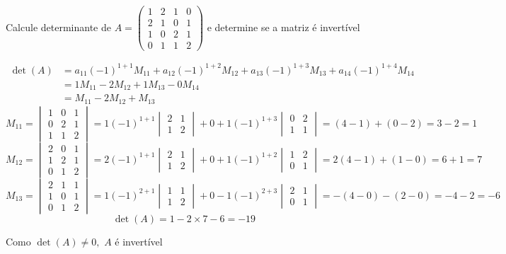 \documentclass[a4paper,12pt,fleqn]{article}
\begin{document}

Calcule determinante de
\(
  A =
  \begin{pmatrix}
    1 & 2 & 1 & 0 \\
    2 & 1 & 0 & 1 \\
    1 & 0 & 2 & 1 \\
    0 & 1 & 1 & 2
  \end{pmatrix}
\)
e determine se a matriz é invertível

\begin{answer}
\begin{align*}
  \det(A)
  & = a_{11}(-1)^{1+1} M_{11}
    + a_{12}(-1)^{1+2} M_{12}
    + a_{13}(-1)^{1+3} M_{13}
    + a_{14}(-1)^{1+4} M_{14} \\
  & = 1 M_{11} - 2 M_{12} + 1 M_{13} - 0 M_{14}   \\
  & = M_{11} - 2 M_{12} + M_{13}
\end{align*}
\[
  M_{11}
  = \begin{vmatrix}
      1 & 0 & 1 \\
      0 & 2 & 1 \\
      1 & 1 & 2
    \end{vmatrix}
  = 1 (-1)^{1+1}
    \begin{vmatrix}
      2 & 1 \\
      1 & 2
    \end{vmatrix}
    + 0
    + 1 (-1)^{1+3}
    \begin{vmatrix}
      0 & 2 \\
      1 & 1
    \end{vmatrix}
  = (4-1)+(0-2)
  = 3 - 2
  = 1
\]
\[
  M_{12}
  = \begin{vmatrix}
    2 & 0 & 1 \\
    1 & 2 & 1 \\
    0 & 1 & 2
  \end{vmatrix}
  = 2  (-1)^{1+1}
  \begin{vmatrix}
    2 & 1 \\
    1 & 2
  \end{vmatrix}
  + 0
  + 1 (-1)^{1+2}
  \begin{vmatrix}
    1 & 2 \\
    0 & 1
  \end{vmatrix}
  = 2(4-1)+(1-0)
  = 6 + 1
  = 7
\]
\[
  M_{13}
  = \begin{vmatrix}
    2 & 1 & 1 \\
    1 & 0 & 1 \\
    0 & 1 & 2
  \end{vmatrix}
  = 1 (-1)^{2+1}
  \begin{vmatrix}
    1 & 1 \\
    1 & 2
  \end{vmatrix}
  + 0
  - 1 (-1)^{2+3}
  \begin{vmatrix}
    2 & 1 \\
    0 & 1
  \end{vmatrix}
  = -(4-0) - (2-0)
  = -4 - 2
  = -6
\]
\[
  \det(A) = 1 -2 \times 7 -6 = -19
\]

Como
\(
  \det(A) \neq 0,
\)
$A$ é invertível
\end{answer}
\end{document}
